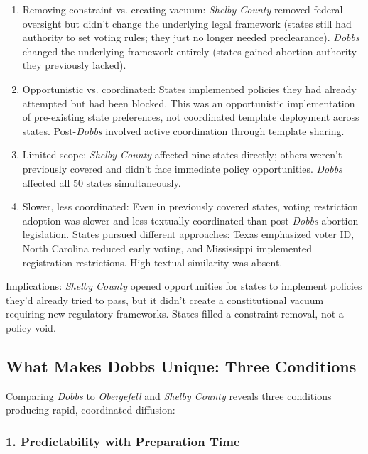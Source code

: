 \begin{enumerate}
\item Removing constraint vs. creating vacuum: \emph{Shelby County} removed federal oversight but didn't change the underlying legal framework (states still had authority to set voting rules; they just no longer needed preclearance). \emph{Dobbs} changed the underlying framework entirely (states gained abortion authority they previously lacked).

\item Opportunistic vs. coordinated: States implemented policies they had already attempted but had been blocked. This was an opportunistic implementation of pre-existing state preferences, not coordinated template deployment across states. Post-\emph{Dobbs} involved active coordination through template sharing.

\item Limited scope: \emph{Shelby County} affected nine states directly; others weren't previously covered and didn't face immediate policy opportunities. \emph{Dobbs} affected all 50 states simultaneously.

\item Slower, less coordinated: Even in previously covered states, voting restriction adoption was slower and less textually coordinated than post-\emph{Dobbs} abortion legislation. States pursued different approaches: Texas emphasized voter ID, North Carolina reduced early voting, and Mississippi implemented registration restrictions. High textual similarity was absent.
\end{enumerate}

Implications: \emph{Shelby County} opened opportunities for states to implement policies they'd already tried to pass, but it didn't create a constitutional vacuum requiring new regulatory frameworks. States filled a constraint removal, not a policy void.

\subsection{What Makes Dobbs Unique: Three Conditions}

Comparing \emph{Dobbs} to \emph{Obergefell} and \emph{Shelby County} reveals three conditions producing rapid, coordinated diffusion:

\subsubsection{1. Predictability with Preparation Time}

